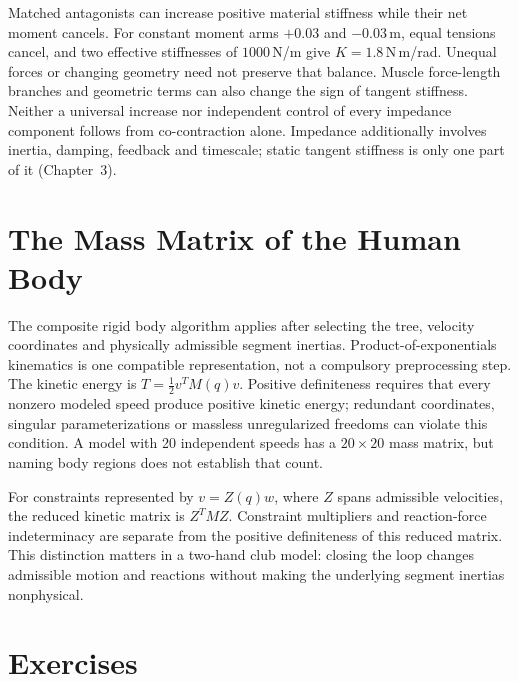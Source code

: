 Matched antagonists can increase positive material stiffness while their net
moment cancels. For constant moment arms $+0.03$ and $-0.03$\,m, equal tensions
cancel, and two effective stiffnesses of $1000$\,N/m give
$K=1.8$\,N\,m/rad. Unequal forces or changing geometry need not preserve that
balance. Muscle force-length branches and geometric terms can also change the
sign of tangent stiffness. Neither a universal increase nor independent control
of every impedance component follows from co-contraction alone.
Impedance additionally involves inertia, damping, feedback and timescale;
static tangent stiffness is only one part of it (Chapter~3).

\section{The Mass Matrix of the Human Body}

The composite rigid body algorithm applies after selecting the tree, velocity
coordinates and physically admissible segment inertias. Product-of-exponentials
kinematics is one compatible representation, not a compulsory preprocessing step.
The kinetic energy is $T=\tfrac12v^TM(q)v$.
Positive definiteness requires that every nonzero modeled speed produce positive
kinetic energy; redundant coordinates, singular parameterizations or massless
unregularized freedoms can violate this condition.
A model with 20 independent speeds has a $20\times20$ mass matrix, but naming
body regions does not establish that count.

For constraints represented by $v=Z(q)w$, where $Z$ spans admissible velocities,
the reduced kinetic matrix is $Z^TMZ$. Constraint multipliers and reaction-force
indeterminacy are separate from the positive definiteness of this reduced matrix.
This distinction matters in a two-hand club model: closing the loop changes
admissible motion and reactions without making the underlying segment inertias
nonphysical.

\section*{Exercises}

